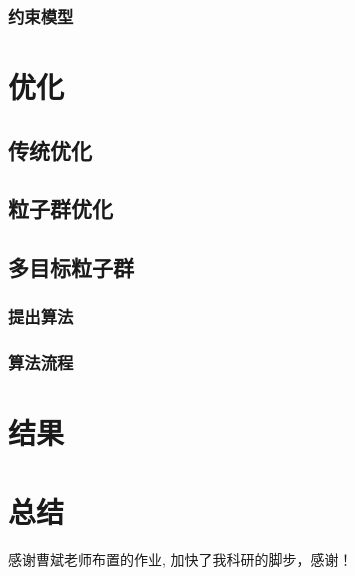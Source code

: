 \documentclass{HEBUTMaster}   %
\begin{document}
\subsection{约束模型}


\chapter{优化}

\section{传统优化}

\section{粒子群优化}

\section{多目标粒子群}

\subsection{提出算法}

\subsection{算法流程}

\chapter{结果}

\chapter{总结}




\cleardoublepage{}
{}
\begin{thebibliography}{000}

  
\end{thebibliography}


\acknowledgement
感谢曹斌老师布置的作业, 加快了我科研的脚步，感谢！


\cleardoublepage
\end{document}
